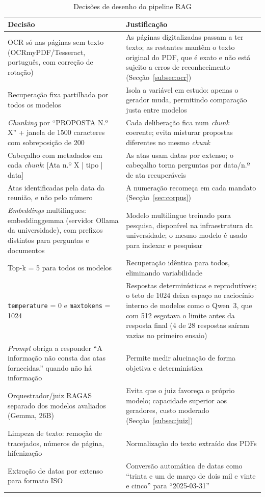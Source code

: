 \documentclass[11pt]{article}
\renewcommand{\_}{\textunderscore\allowbreak}
\begin{document}
\begin{table}[h!]
\centering
\caption{Decisões de desenho do pipeline RAG}
\label{tab:decisoes}
\begin{tabular}{>{\raggedright\arraybackslash}p{7cm}>{\raggedright\arraybackslash}p{8cm}}
\toprule
\textbf{Decisão} & \textbf{Justificação} \\ \midrule
OCR só nas páginas sem texto (OCRmyPDF/Tesseract, português, com correção de rotação) & As páginas digitalizadas passam a ter texto; as restantes mantêm o texto original do PDF, que é exato e não está sujeito a erros de reconhecimento (Secção~\ref{subsec:ocr}) \\ \midrule
Recuperação fixa partilhada por todos os modelos & Isola a variável em estudo: apenas o gerador muda, permitindo comparação justa entre modelos \\ \midrule
\textit{Chunking} por ``PROPOSTA N.º X'' + janela de 1500 caracteres com sobreposição de 200 & Cada deliberação fica num \textit{chunk} coerente; evita misturar propostas diferentes no mesmo \textit{chunk} \\ \midrule
Cabeçalho com metadados em cada \textit{chunk}: [Ata n.º X | tipo | data] & As atas usam datas por extenso; o cabeçalho torna perguntas por data/n.º de ata recuperáveis \\ \midrule
Atas identificadas pela data da reunião, e não pelo número & A numeração recomeça em cada mandato (Secção~\ref{sec:corpus}) \\ \midrule
\textit{Embeddings} multilingues: embeddinggemma (servidor Ollama da universidade), com prefixos distintos para perguntas e documentos & Modelo multilingue treinado para pesquisa, disponível na infraestrutura da universidade; o mesmo modelo é usado para indexar e pesquisar \\ \midrule
Top-k = 5 para todos os modelos & Recuperação idêntica para todos, eliminando variabilidade \\ \midrule
\texttt{temperature} = 0 e \texttt{max\_tokens} = 1024 & Respostas determinísticas e reprodutíveis; o teto de 1024 deixa espaço ao raciocínio interno de modelos como o Qwen~3, que com 512 esgotava o limite antes da resposta final (4 de 28 respostas saíram vazias no primeiro ensaio) \\ \midrule
\textit{Prompt} obriga a responder ``A informação não consta das atas fornecidas.'' quando não há informação & Permite medir alucinação de forma objetiva e determinística \\ \midrule
Orquestrador/juiz RAGAS separado dos modelos avaliados (Gemma, 26B) & Evita que o juiz favoreça o próprio modelo; capacidade superior aos geradores, custo moderado (Secção~\ref{subsec:juiz}) \\ \midrule
Limpeza de texto: remoção de tracejados, números de página, hifenização & Normalização do texto extraído dos PDFs \\ \midrule
Extração de datas por extenso para formato ISO & Conversão automática de datas como ``trinta e um de março de dois mil e vinte e cinco'' para ``2025-03-31'' \\ \bottomrule
\end{tabular}
\end{table}
\newpage 
\end{document}
